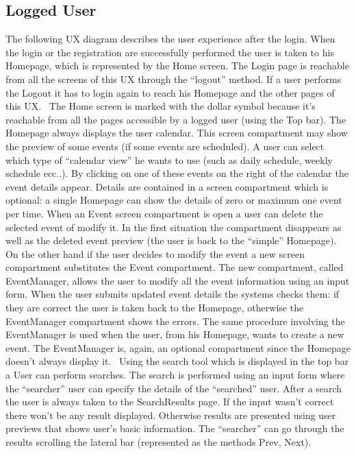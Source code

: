 \documentclass[10pt,a4paper,titlepage]{article}
\begin{document}
\subsection{Logged User}
The following UX diagram describes the user experience after the login. When the login or the registration are successfully performed the user is taken to his Homepage, which is represented by the Home screen. The Login page is reachable from all the screens of this UX through the “logout” method. If a user performs the Logout it has to login again to reach his Homepage and the other pages of this UX.
\
The Home screen is marked with the dollar symbol because it’s reachable from all the pages accessible by a logged user (using the Top bar). The Homepage always displays the user calendar. This screen compartment may show the preview of some events (if some events are scheduled).  A user can select which type of “calendar view” he wants to use (such as daily schedule, weekly schedule ecc..). By clicking on one of these events on the right of the calendar the event details appear. Details are contained in a screen compartment which is optional: a single Homepage can show the details of zero or maximum one event per time. 
When an Event screen compartment is open a user can delete the selected event of modify it. In the first situation the compartment disappears as well as the deleted event preview (the user is back to the “simple” Homepage). 
On the other hand if the user decides to modify the event a new screen compartment substitutes the Event compartment. The new compartment, called EventManager, allows the user to modify all the event information using an input form. When the user submits updated event details the systems checks them: if they are correct the user is taken back to the Homepage, otherwise the EventManager compartment shows the errors. 
The same procedure involving the EventManager is used when the user, from his Homepage, wants to create a new event.  The EventManager is, again, an optional compartment since the Homepage doesn’t always display it.
\
Using the search tool which is displayed in the top bar a User can perform searches.  The search is performed using an input form where the “searcher” user can specify the details of the “searched” user. After a search the user is always taken to the SearchResults page. If the input wasn’t correct there won’t be any result displayed. Otherwise results are presented using user previews that shows user’s basic information. The “searcher” can go through the results scrolling the lateral bar (represented as the methods Prev, Next). 
\end{document}
